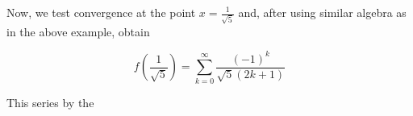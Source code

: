 \documentclass{ximera}
\begin{document}
\begin{exercise}
\begin{exercise}
\begin{exercise}
\begin{hint}
Now, we test convergence at the point  $x=\frac{1}{\sqrt{5}}$ and, after using similar algebra as in the above example, obtain

\[
f\left(\frac{1}{\sqrt{5}}\right) = \sum^{\infty}_{k=0} \frac{(-1)^k}{\sqrt{5}(2k+1)}
\]


This series  by the 

\begin{multipleChoice}
\end{multipleChoice}

\end{hint}




\end{exercise}
\end{exercise}
\end{exercise}
\end{document}
